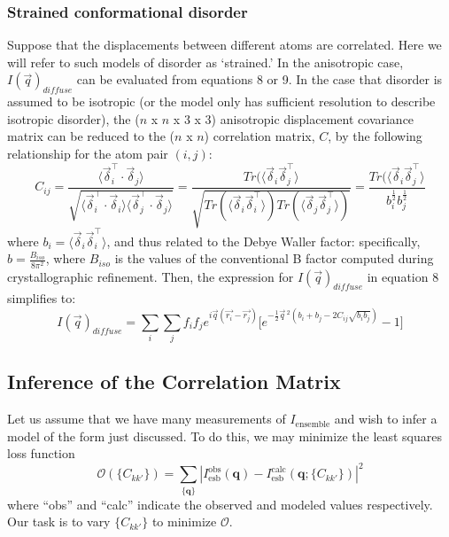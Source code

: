 \documentclass{article}
\begin{document}
\subsubsection{Strained conformational disorder} Suppose that the displacements between different atoms are correlated. Here we will refer to such models of disorder as `strained.' In the anisotropic case, $I(\vec{q})_{diffuse}$ can be evaluated from equations 8 or 9. In the case that disorder is assumed to be isotropic (or the model only has sufficient resolution to describe isotropic disorder), the ($n$ x $n$ x $3$ x $3$) anisotropic displacement covariance matrix can be reduced to the ($n$ x $n$) correlation matrix, $C$, by the following relationship for the atom pair $(i, j)$:
\begin{equation}
C_{ij} = \frac{ \langle \vec{\delta}_i^\intercal \cdot \vec{\delta}_j \rangle }{\sqrt{\langle \vec{\delta}_i^\intercal \cdot \vec{\delta}_i \rangle \langle \vec{\delta}_j^\intercal \cdot \vec{\delta}_j \rangle }} =\frac{Tr(\langle \vec{\delta}_i \vec{\delta}_j^\intercal \rangle}{\sqrt{Tr(\langle \vec{\delta}_i \vec{\delta}_i^\intercal \rangle)Tr(\langle \vec{\delta}_j \vec{\delta}_j^\intercal \rangle)}} = \frac{ Tr(\langle \vec{\delta}_i \vec{\delta}_j^\intercal \rangle}{b_i^{\frac{1}{2}}b_{j}^{\frac{1}{2}}}
\end{equation}
where $b_i = \langle \vec{\delta}_i \vec{\delta}_i^\intercal \rangle$, and thus related to the Debye Waller factor: specifically, $b = \frac{B_{iso}}{8\pi^2}$, where $B_{iso}$ is the values of the conventional B factor computed during crystallographic refinement. Then, the expression for $I(\vec{q})_{diffuse}$ in equation 8 simplifies to:
\begin{equation}
I(\vec{q})_{diffuse} = \sum\limits_{i}\sum\limits_{j}f_{i}f_{j}e^{i\vec{q}(\vec{r_{i}} - \vec{r_{j}})} \lbrack e^{-\frac{1}{2}\vec{q}\,^2(b_i + b_j - 2 C_{ij}\sqrt{b_i b_{j}})} - 1 \rbrack
\end{equation}

\subsection{Inference of the Correlation Matrix}

Let us assume that we have many measurements of $I_\mathrm{ensemble}$ and wish to infer a model of the form just discussed. To do this, we may minimize the least squares loss function
\[
\mathcal{O} ( \{ C_{kk'} \} )= \sum_{\{\mathbf{q}\}} \left| I_\mathrm{esb}^\mathrm{obs} (\mathbf{q}) 
- I_\mathrm{esb}^\mathrm{calc} (\mathbf{q}; \{ C_{kk'} \}) \right|^2
\]
where ``obs'' and ``calc'' indicate the observed and modeled values respectively. Our task is to vary $ \{ C_{kk'} \}$ to minimize $\mathcal{O}$. 
\end{document}
